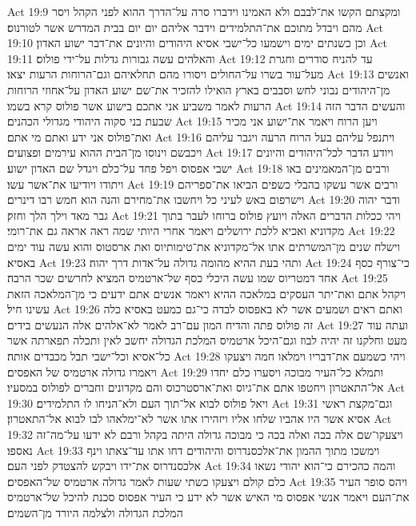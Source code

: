 Act 19:9  ומקצתם הקשו את־לבבם ולא האמינו וידברו סרה על־הדרך ההוא לפני הקהל ויסר מהם ויבדל מתוכם את־התלמידים וידבר אליהם יום יום בבית המדרש אשר לטורנוס׃
Act 19:10  וכן כשנתים ימים וישמעו כל־ישבי אסיא היהודים והיונים את־דבר ישוע האדון׃
Act 19:11  והאלהים עשה גבורות גדלות על־ידי פולוס׃
Act 19:12  עד להניח סודרים וחגרת מעל־עור בשרו על־החולים ויסורו מהם תחלאיהם וגם־הרוחות הרעות יצאו׃
Act 19:13  ואנשים מן־היהודים נבוני לחש וסבבים בארץ הואילו להזכיר את־שם ישוע האדון על־אחוזי הרוחות הרעות לאמר משביע אני אתכם בישוע אשר פולוס קרא בשמו׃
Act 19:14  והעשים הדבר הזה שבעת בני סקוה היהודי מגדולי הכהנים׃
Act 19:15  ויען הרוח ויאמר את־ישוע אני מכיר ואת־פולוס אני ידע ואתם מי אתם׃
Act 19:16  ויתנפל עליהם בעל הרוח הרעה ויגבר עליהם ויכבשם וינוסו מן־הבית ההוא עירמים ופצועים׃
Act 19:17  ויודע הדבר לכל־היהודים והיונים ישבי אפסוס ויפל פחד על־כלם ויגדל שם האדון ישוע׃
Act 19:18  ורבים מן־המאמינים באו ויתודו ויודיעו את־אשר עשו׃
Act 19:19  ורבים אשר עשקו בהבלי כשפים הביאו את־ספריהם וישרפום באש לעיני כל ויחשבו את־מחירם והנה הוא חמש רבו דינרים׃
Act 19:20  ודבר יהוה גבר מאד וילך הלך וחזק׃
Act 19:21  ויהי ככלות הדברים האלה ויועץ פולוס ברוחו לעבר בתוך מקדוניא ואכיא ללכת ירושלים ויאמר אחרי היותי שמה ראה אראה גם את־רומי׃
Act 19:22  וישלח שנים מן־המשרתים אתו אל־מקדוניא את־טימותיוס ואת ארסטוס והוא עשה עוד ימים באסיא׃
Act 19:23  ותהי בעת ההיא מהומה גדולה על־אדות דרך יהוה׃
Act 19:24  כי־צורף כסף אחד דמטריוס שמו עשה היכלי כסף של־ארטמיס המציא לחרשים שכר הרבה׃
Act 19:25  ויקהל אתם ואת־יתר העסקים במלאכה ההיא ויאמר אנשים אתם ידעים כי מן־המלאכה הזאת עשינו חיל׃
Act 19:26  ואתם ראים ושמעים אשר לא באפסוס לבדה כי־גם כמעט באסיא כלה זה פולוס פתה והדיח המון עם־רב לאמר לא־אלהים אלה הנעשים בידים׃
Act 19:27  ועתה עוד מעט וחלקנו זה יהיה לבוז וגם־היכל ארטמיס המלכת הגדולה יחשב לאין ותכלה תפארתה אשר כל־אסיא וכל־ישבי תבל מכבדים אותה׃
Act 19:28  ויהי כשמעם את־דבריו וימלאו חמה ויצעקו ויאמרו גדולה ארטמיס של האפסים׃
Act 19:29  ותמלא כל־העיר מבוכה ויסערו כלם יחדו אל־התאטרון ויחטפו אתם את־גיוס ואת־ארסטרכוס והם מקדונים וחברים לפולוס במסעיו׃
Act 19:30  ויאל פולוס לבוא אל־תוך העם ולא־הניחו לו התלמידים׃
Act 19:31  וגם־מקצת ראשי אסיא אשר היו אהביו שלחו אליו ויזהירו אתו אשר לא־ימלאהו לבו לבוא אל־התאטרון׃
Act 19:32  ויצעקו־שם אלה בכה ואלה בכה כי מבוכה גדולה היתה בקהל ורבם לא ידעו על־מה־זה נאספו׃
Act 19:33  וימשכו מתוך ההמון את־אלכסנדרוס והיהודים דחו אתו עד־צאתו וינף אלכסנדרוס את־ידו ויבקש להצטדק לפני העם׃
Act 19:34  והמה כהכירם כי־הוא יהודי נשאו כלם קולם ויצעקו כשתי שעות לאמר גדולה ארטמיס של־האפסים׃
Act 19:35  ויהס סופר העיר את־העם ויאמר אנשי אפסוס מי האיש אשר לא ידע כי העיר אפסוס סכנת להיכל של־ארטמיס המלכת הגדולה ולצלמה היורד מן־השמים׃
